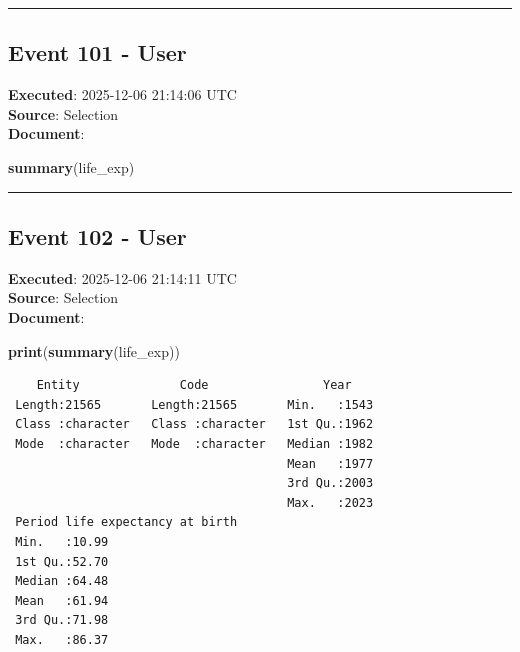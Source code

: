 \documentclass[
  11pt,
]{article}
\newenvironment{Shaded}{\begin{snugshade}}{\end{snugshade}}
\newcommand{\FunctionTok}[1]{\textcolor[rgb]{0.13,0.29,0.53}{\textbf{#1}}}
\newcommand{\NormalTok}[1]{#1}
\newenvironment{rpoutput}{\vspace{0.5em}\begin{snugshade}}{\end{snugshade}}
\begin{document}
\begin{center}\rule{0.5\linewidth}{0.5pt}\end{center}

\subsection{Event 101 - User}\label{event-101---user}

\textbf{Executed}: 2025-12-06 21:14:06 UTC\\
\textbf{Source}: Selection\\
\textbf{Document}:

\begin{Shaded}
\begin{Highlighting}[]
\FunctionTok{summary}\NormalTok{(life\_exp)}
\end{Highlighting}
\end{Shaded}

\begin{center}\rule{0.5\linewidth}{0.5pt}\end{center}

\subsection{Event 102 - User}\label{event-102---user}

\textbf{Executed}: 2025-12-06 21:14:11 UTC\\
\textbf{Source}: Selection\\
\textbf{Document}:

\begin{Shaded}
\begin{Highlighting}[]
\FunctionTok{print}\NormalTok{(}\FunctionTok{summary}\NormalTok{(life\_exp))}
\end{Highlighting}
\end{Shaded}

\begin{rpoutput}

\begin{verbatim}
    Entity              Code                Year     
 Length:21565       Length:21565       Min.   :1543  
 Class :character   Class :character   1st Qu.:1962  
 Mode  :character   Mode  :character   Median :1982  
                                       Mean   :1977  
                                       3rd Qu.:2003  
                                       Max.   :2023  
 Period life expectancy at birth
 Min.   :10.99                  
 1st Qu.:52.70                  
 Median :64.48                  
 Mean   :61.94                  
 3rd Qu.:71.98                  
 Max.   :86.37                  
\end{verbatim}

\end{rpoutput}
\end{document}
